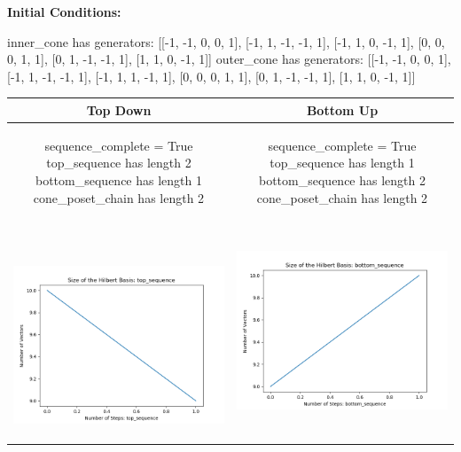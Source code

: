 \documentclass[10pt]{article}
\begin{document}
\textbf{Initial Conditions:}
\begin{SAGE}
inner_cone has generators: 
[[-1, -1, 0, 0, 1], [-1, 1, -1, -1, 1], [-1, 1, 0, -1, 1], [0, 0, 0, 1, 1], [0, 1, -1, -1, 1], [1, 1, 0, -1, 1]]
outer_cone has generators: 
[[-1, -1, 0, 0, 1], [-1, 1, -1, -1, 1], [-1, 1, 1, -1, 1], [0, 0, 0, 1, 1], [0, 1, -1, -1, 1], [1, 1, 0, -1, 1]]

\end{SAGE}
\begin{tabular}{c|c}
\textbf{Top Down} & \textbf{Bottom Up} \\ \hline  
\begin{SAGE}
	sequence_complete = True
	top_sequence has length 2
	bottom_sequence has length 1
	cone_poset_chain has length 2
\end{SAGE} 
&
\begin{SAGE}
	sequence_complete = True
	top_sequence has length 1
	bottom_sequence has length 2
	cone_poset_chain has length 2
\end{SAGE} 
\\ \hline
\
\begin{minipage}{.45\textwidth}
\includegraphics[width=\textwidth]{"DATA/5d/6 generators 1 bound D/top_sequence SIZE"}
\end{minipage} &
\begin{minipage}{.45\textwidth}
\includegraphics[width=\textwidth]{"DATA/5d/6 generators 1 bound D bottomup/bottom_sequence SIZE"}

\end{minipage}
\end{tabular}
\end{document}
